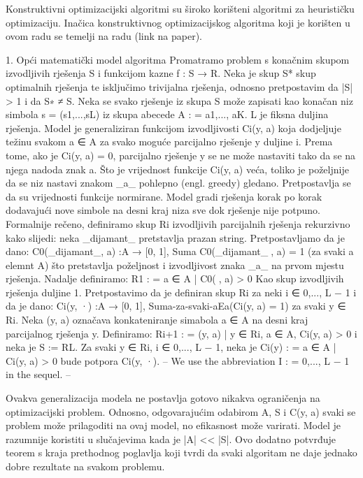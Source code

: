Konstruktivni optimizacijski algoritmi su široko korišteni algoritmi za heurističku optimizaciju. Inačica konstruktivnog optimizacijskog algoritma
koji je korišten u ovom radu se temelji na radu (link na paper).

1. Opći matematički model algoritma
Promatramo problem s konačnim skupom izvodljivih rješenja S i funkcijom kazne f : S → R. Neka je skup S* skup optimalnih rješenja te isključimo trivijalna rješenja,
odnosno pretpostavim da |S| > 1 i da S∗ ≠ S. Neka se svako rješenje iz skupa S može zapisati kao konačan niz simbola s = (s1,...,sL) iz skupa abecede A : =
{a1,..., aK}. L je fiksna duljina rješenja. Model je generaliziran funkcijom izvodljivosti Ci(y, a) koja dodjeljuje težinu svakom a ∈ A za svako moguće parcijalno
rješenje y duljine i. Prema tome, ako je Ci(y, a) = 0, parcijalno rješenje y se ne može nastaviti tako da se na njega nadoda znak a. Što je vrijednost funkcije Ci(y, a) veća,
toliko je poželjnije da se niz nastavi znakom _a_ pohlepno (engl. greedy) gledano. Pretpostavlja se da su vrijednosti funkcije normirane. Model gradi rješenja korak po korak
dodavajući nove simbole na desni kraj niza sve dok rješenje nije potpuno. Formalnije rečeno, definiramo skup Ri izvodljivih parcijalnih rješenja rekurzivno kako slijedi:
neka _dijamant_ pretstavlja prazan string. Pretpostavljamo da je dano:
C0(_dijamant_, a) :A → [0, 1], Suma C0(_dijamant_, a) = 1 (za svaki a elemnt A)
što pretstavlja poželjnost i izvodljivost znaka _a_ na prvom mjestu rješenja. Nadalje definiramo:
R1 : = {a ∈ A | C0(, a) > 0}
Kao skup izvodljivih rješenja duljine 1. Pretpostavimo da je definiran skup Ri za neki i  ∈ {0,..., L − 1} i da je dano:
Ci(y, ·) :A → [0, 1], Suma-za-svaki-aEa(Ci(y, a) = 1) za svaki y ∈ Ri.
Neka (y, a) označava konkateniranje simabola a ∈ A na desni kraj parcijalnog rješenja y. Definiramo:
Ri+1 : = { (y, a) | y ∈ Ri, a ∈ A, Ci(y, a) > 0 }
i neka je S := RL. Za svaki y ∈ Ri, i ∈ {0,..., L − 1}, neka je
Ci(y) : = {a ∈ A | Ci(y, a) > 0}
bude potpora Ci(y, ·). -- We use the abbreviation I : = {0,..., L − 1} in the sequel. --

Ovakva generalizacija modela ne postavlja gotovo nikakva ograničenja na optimizacijski problem. Odnosno, odgovarajućim odabirom A, S i C(y, a) svaki se problem može
prilagoditi na ovaj model, no efikasnost može varirati. Model je razumnije koristiti u slučajevima kada je |A| << |S|. Ovo dodatno potvrđuje
teorem s kraja prethodnog poglavlja koji tvrdi da svaki algoritam ne daje jednako dobre rezultate na svakom problemu.


